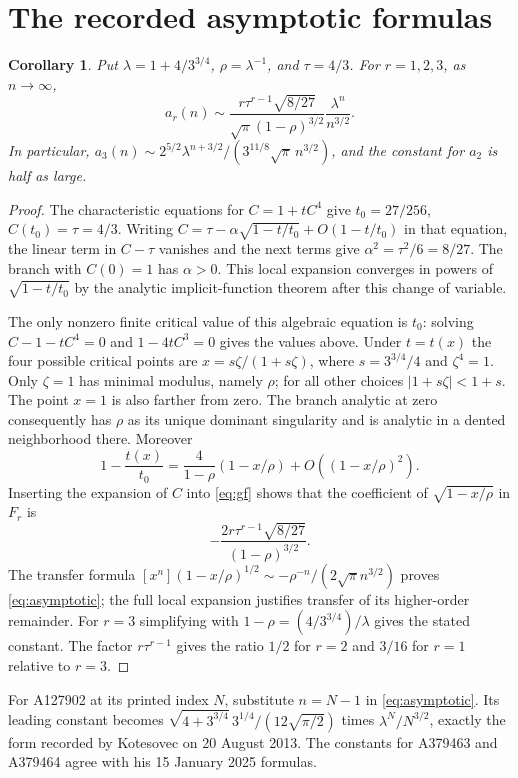 \documentclass[11pt]{article}
\newtheorem{corollary}[theorem]{Corollary}
\begin{document}
\section{The recorded asymptotic formulas}\label{sec:asymptotic}
\begin{corollary}\label{cor:asymptotic}
Put $\lambda=1+4/3^{3/4}$, $\rho=\lambda^{-1}$, and $\tau=4/3$.
For $r=1,2,3$, as $n\to\infty$,
\begin{equation}\label{eq:asymptotic}
 a_r(n)\sim
 \frac{r\tau^{r-1}\sqrt{8/27}}{\sqrt\pi(1-\rho)^{3/2}}
 \frac{\lambda^n}{n^{3/2}}.
\end{equation}
In particular, $a_3(n)\sim
2^{5/2}\lambda^{n+3/2}/(3^{11/8}\sqrt\pi\,n^{3/2})$,
and the constant for $a_2$ is half as large.
\end{corollary}
\begin{proof}
The characteristic equations for $C=1+tC^4$ give
$t_0=27/256$, $C(t_0)=\tau=4/3$.
Writing $C=\tau-\alpha\sqrt{1-t/t_0}+O(1-t/t_0)$ in that equation,
the linear term in $C-\tau$ vanishes and the next terms give
$\alpha^2=\tau^2/6=8/27$. The branch with $C(0)=1$ has
$\alpha>0$. This local expansion converges in powers of
$\sqrt{1-t/t_0}$ by the analytic implicit-function theorem after this
change of variable.

The only nonzero finite critical value of this algebraic equation is $t_0$:
solving $C-1-tC^4=0$ and $1-4tC^3=0$ gives the values above.
Under $t=t(x)$ the four possible critical points are
$x=s\zeta/(1+s\zeta)$, where $s=3^{3/4}/4$ and $\zeta^4=1$.
Only $\zeta=1$ has minimal modulus, namely $\rho$; for all other choices
$|1+s\zeta|<1+s$. The point $x=1$ is also farther from zero.
The branch analytic at zero consequently has $\rho$ as its unique
dominant singularity and is analytic in a dented neighborhood there.
Moreover
\[
 1-\frac{t(x)}{t_0}=\frac4{1-\rho}(1-x/\rho)
                           +O((1-x/\rho)^2).
\]
Inserting the expansion of $C$ into \eqref{eq:gf} shows that the coefficient
of $\sqrt{1-x/\rho}$ in $F_r$ is
\[
 -\frac{2r\tau^{r-1}\sqrt{8/27}}{(1-\rho)^{3/2}}.
\]
The transfer formula
$[x^n](1-x/\rho)^{1/2}\sim-\rho^{-n}/(2\sqrt\pi n^{3/2})$
\cite[Theorems VI.1 and VI.3]{ac} proves \eqref{eq:asymptotic};
the full local expansion justifies transfer of its higher-order remainder.
For $r=3$ simplifying with $1-\rho=(4/3^{3/4})/\lambda$ gives the
stated constant. The factor $r\tau^{r-1}$ gives the ratio $1/2$ for
$r=2$ and $3/16$ for $r=1$ relative to $r=3$.
\end{proof}

For A127902 at its printed index $N$, substitute $n=N-1$ in
\eqref{eq:asymptotic}. Its leading constant becomes
$\sqrt{4+3^{3/4}}\,3^{1/4}/(12\sqrt{\pi/2})$ times
$\lambda^N/N^{3/2}$, exactly the form recorded by Kotesovec on
20 August 2013. The constants for A379463 and A379464 agree with his
15 January 2025 formulas.
\end{document}
